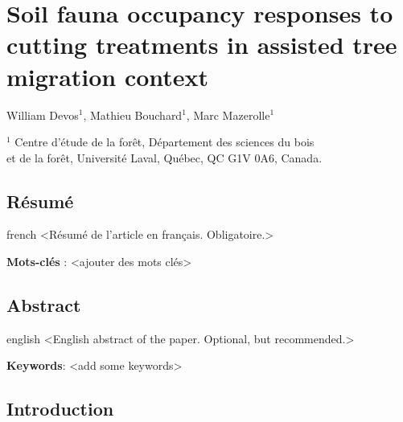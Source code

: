 \chapter{Soil fauna occupancy responses to cutting treatments in assisted tree migration context}     %
\label{chap:SEM}    

William Devos$^1$, Mathieu Bouchard$^1$, Marc Mazerolle$^1$

$^1$ Centre d'étude de la forêt, Département des sciences du bois \\ 
et de la forêt, Université Laval, Québec, QC G1V 0A6, Canada. \\ 

\clearpage



\section*{Résumé}
\label{sec:resume1}

\begin{otherlanguage*}{french}
  <Résumé de l'article en français. Obligatoire.>

  \textbf{Mots-clés} : <ajouter des mots clés>
\end{otherlanguage*}

\clearpage

\section*{Abstract}
\label{sec:abstract1}

\begin{otherlanguage*}{english}
  <English abstract of the paper. Optional, but recommended.>

\textbf{Keywords}: <add some keywords> 
\end{otherlanguage*}

\cleardoublepage

\section*{Introduction}
\label{sec:intro1}


